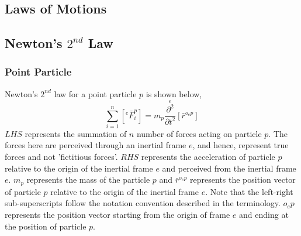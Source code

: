 \documentclass[class=report, 12pt, crop=false]{standalone}
\begin{document}
\begin{center}
\chapter{Laws of Motions}
\begin{comment}
\end{comment}
\section{Newton's $2^{nd}$ Law}
\begin{comment}
\end{comment}
\subsection{Point Particle}
\begin{comment}
\end{comment}
Newton's $2^{nd}$ law for a point particle $p$ is shown below,
$$\sum^{n}_{i = 1}\left[{}^{e}\bar{F}^{p}_{i}\right] = m_{p}\overset{e}{\frac{\partial^{2}}{\partial t^{2}}}[\bar{r}^{o_{e}p}]$$
$LHS$ represents the summation of $n$ number of forces acting on particle $p$. The forces here are perceived through an inertial frame $e$, and hence, represent true forces and not 'fictitious forces'. $RHS$ represents the acceleration of particle $p$ relative to the origin of the inertial frame $e$ and perceived from the inertial frame $e$. $m_{p}$ represents the mass of the particle $p$ and $\bar{r}^{o_{e}p}$ represents the position vector of particle $p$ relative to the origin of the inertial frame $e$. Note that the left-right sub-superscripts follow the notation convention described in the terminology. $o_{e}p$ represents the position vector starting from the origin of frame $e$ and ending at the position of particle $p$. 

\end{center}
\end{document}

